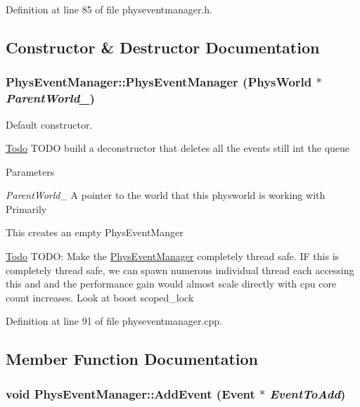 Definition at line 85 of file physeventmanager.h.



\subsection{Constructor \& Destructor Documentation}
\hypertarget{classPhysEventManager_a1355f36d99de303cec6f3b27cadaa9ff}{
\subsubsection[{PhysEventManager}]{\setlength{\rightskip}{0pt plus 5cm}PhysEventManager::PhysEventManager ({\bf PhysWorld} $\ast$ {\em ParentWorld\_\-})}}
\label{d5/dd7/classPhysEventManager_a1355f36d99de303cec6f3b27cadaa9ff}


Default constructor. 

\begin{Desc}
\item[\hyperlink{todo__todo000006}{Todo}]TODO build a deconstructor that deletes all the events still int the queue \end{Desc}

\begin{DoxyParams}{Parameters}
\item[{\em ParentWorld\_\-}]A pointer to the world that this physworld is working with Primarily\end{DoxyParams}
This creates an empty PhysEventManger

\begin{Desc}
\item[\hyperlink{todo__todo000005}{Todo}]TODO: Make the \hyperlink{classPhysEventManager}{PhysEventManager} completely thread safe. IF this is completely thread safe, we can spawn numerous individual thread each accessing this and and the performance gain would almost scale directly with cpu core count increases. Look at boost scoped\_\-lock \end{Desc}


Definition at line 91 of file physeventmanager.cpp.



\subsection{Member Function Documentation}
\hypertarget{classPhysEventManager_a6f51657b66d214942aed0e832ee558ef}{
\subsubsection[{AddEvent}]{\setlength{\rightskip}{0pt plus 5cm}void PhysEventManager::AddEvent ({\bf Event} $\ast$ {\em EventToAdd})}}
\label{d5/dd7/classPhysEventManager_a6f51657b66d214942aed0e832ee558ef}


